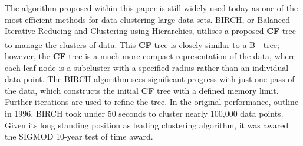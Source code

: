 \documentclass[pdftex,12pt,letter]{article}
\begin{document}
\begin{enumerate}
The algorithm proposed within this paper is still widely used today as one of the most efficient methods for data clustering large data sets. BIRCH, or Balanced Iterative Reducing and Clustering using Hierarchies, utilises a proposed \textbf{CF} tree to manage the clusters of data. This \textbf{CF} tree is closely similar to a B\textsuperscript{+}-tree; however, the \textbf{CF} tree is a much more compact representation of the data, where each leaf node is a subcluster with a specified radius rather than an individual data point. The BIRCH algorithm sees significant progress with just one pass of the data, which constructs the initial \textbf{CF} tree with a defined memory limit. Further iterations are used to refine the tree. In the original performance, outline in 1996, BIRCH took under 50 seconds to cluster nearly 100,000 data points. Given its long standing position as leading clustering algorithm, it was awared the SIGMOD 10-year test of time award.




\end{enumerate}
\FloatBarrier
\end{document}
